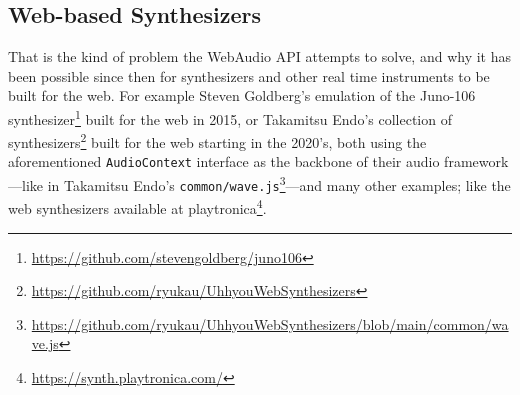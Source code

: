 \subsection{Web-based Synthesizers}
\noindent
That is the kind of problem the WebAudio API attempts to solve, and why it has been possible since then for 
synthesizers and other real time instruments to be built for the web. For example Steven Goldberg's 
emulation of the Juno-106 synthesizer\footnote{\url{https://github.com/stevengoldberg/juno106}} 
built for the web in 2015, or Takamitsu Endo's collection of 
synthesizers\footnote{\url{https://github.com/ryukau/UhhyouWebSynthesizers}\label{fn:ryukau}} built for the web starting 
in the 2020's, both using the aforementioned \texttt{AudioContext} interface as the backbone of their 
audio framework---like in Takamitsu Endo's 
\texttt{common/wave.js}\footnote{\url{https://github.com/ryukau/UhhyouWebSynthesizers/blob/main/common/wave.js}}---and 
many other examples; like the web synthesizers available at playtronica\footnote{\url{https://synth.playtronica.com/}}.

